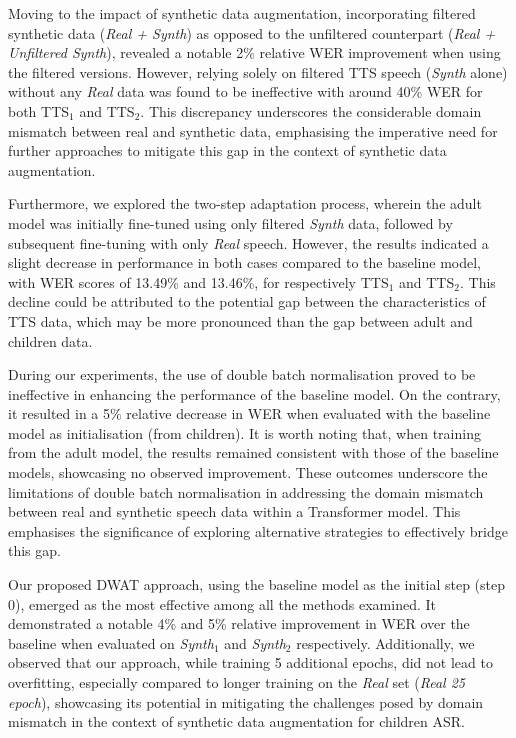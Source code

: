 Moving to the impact of synthetic data augmentation, incorporating filtered synthetic data (\textit{Real +  Synth}) as opposed to the unfiltered counterpart (\textit{Real + Unfiltered Synth}), revealed a notable 2\% relative \ac{WER} improvement when using the filtered versions. However, relying solely on filtered \ac{TTS} speech (\textit{Synth} alone) without any \textit{Real} data was found to be ineffective with around 40\% \ac{WER} for both TTS$_1$ and TTS$_2$. This discrepancy underscores the considerable domain mismatch between real and synthetic data, emphasising the imperative need for further approaches to mitigate this gap in the context of synthetic data augmentation.

Furthermore, we explored the two-step adaptation process, wherein the adult model was initially fine-tuned using only filtered \textit{Synth} data, followed by subsequent fine-tuning with only \textit{Real} speech. However, the results indicated a slight decrease in performance in both cases compared to the baseline model, with \ac{WER} scores of 13.49\% and 13.46\%, for respectively TTS$_1$ and TTS$_2$. This decline could be attributed to the potential gap between the characteristics of \ac{TTS} data, which may be more pronounced than the gap between adult and children data.


During our experiments, the use of double batch normalisation proved to be ineffective in enhancing the performance of the baseline model. On the contrary, it resulted in a 5\% relative decrease in \ac{WER}  when evaluated with the baseline model as initialisation (from children). It is worth noting that, when training from the adult model, the results remained consistent with those of the baseline models, showcasing no observed improvement. These outcomes underscore the limitations of double batch normalisation in addressing the domain mismatch between real and synthetic speech data within a Transformer model. This emphasises the significance of exploring alternative strategies to effectively bridge this gap.


Our proposed \ac{DWAT} approach, using the baseline model as the initial step (step 0), emerged as the most effective among all the methods examined. It demonstrated a notable 4\% and 5\% relative improvement in \ac{WER} over the baseline when evaluated on \textit{Synth$_1$} and \textit{Synth$_2$} respectively. Additionally, we observed that our approach, while training 5 additional epochs, did not lead to overfitting, especially compared to longer training on the \textit{Real} set (\textit{Real 25 epoch}), showcasing its potential in mitigating the challenges posed by domain mismatch in the context of synthetic data augmentation for children \ac{ASR}.


